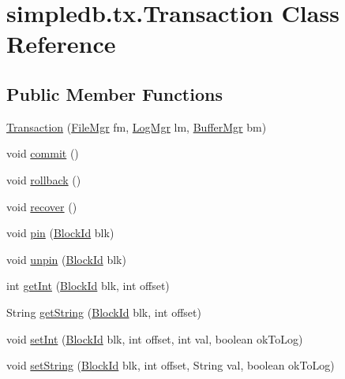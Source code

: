 \hypertarget{classsimpledb_1_1tx_1_1Transaction}{}\section{simpledb.\+tx.\+Transaction Class Reference}
\label{classsimpledb_1_1tx_1_1Transaction}
\subsection*{Public Member Functions}
\begin{DoxyCompactItemize}
\item 
\hyperlink{classsimpledb_1_1tx_1_1Transaction_a1c2f61c55730c0de8ca616197cf2ec08}{Transaction} (\hyperlink{classsimpledb_1_1file_1_1FileMgr}{File\+Mgr} fm, \hyperlink{classsimpledb_1_1log_1_1LogMgr}{Log\+Mgr} lm, \hyperlink{classsimpledb_1_1buffer_1_1BufferMgr}{Buffer\+Mgr} bm)
\item 
void \hyperlink{classsimpledb_1_1tx_1_1Transaction_a853d9a4e2979555d80806793fb1f83fb}{commit} ()
\item 
void \hyperlink{classsimpledb_1_1tx_1_1Transaction_a1fea478b918e70a45caa0521c1686a73}{rollback} ()
\item 
void \hyperlink{classsimpledb_1_1tx_1_1Transaction_a857670b0a879033a797cbe5658463db1}{recover} ()
\item 
void \hyperlink{classsimpledb_1_1tx_1_1Transaction_a782c86ca857e897c9886bec8269b4c74}{pin} (\hyperlink{classsimpledb_1_1file_1_1BlockId}{Block\+Id} blk)
\item 
void \hyperlink{classsimpledb_1_1tx_1_1Transaction_a42fe8eafb8392377f70bf747cb219dbb}{unpin} (\hyperlink{classsimpledb_1_1file_1_1BlockId}{Block\+Id} blk)
\item 
int \hyperlink{classsimpledb_1_1tx_1_1Transaction_a1ccaf673a876a9c3fc0deda5638172df}{get\+Int} (\hyperlink{classsimpledb_1_1file_1_1BlockId}{Block\+Id} blk, int offset)
\item 
String \hyperlink{classsimpledb_1_1tx_1_1Transaction_a4af20129bd0e8fa7eb26efa308bba6b3}{get\+String} (\hyperlink{classsimpledb_1_1file_1_1BlockId}{Block\+Id} blk, int offset)
\item 
void \hyperlink{classsimpledb_1_1tx_1_1Transaction_ade3cfca948f02de979004f34a23a1237}{set\+Int} (\hyperlink{classsimpledb_1_1file_1_1BlockId}{Block\+Id} blk, int offset, int val, boolean ok\+To\+Log)
\item 
void \hyperlink{classsimpledb_1_1tx_1_1Transaction_a3cfe6dbb03d9c83d48c01ac68b520e2a}{set\+String} (\hyperlink{classsimpledb_1_1file_1_1BlockId}{Block\+Id} blk, int offset, String val, boolean ok\+To\+Log)

\end{DoxyCompactItemize}
